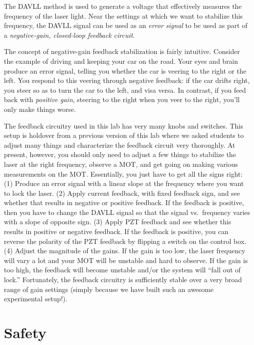 \documentclass{../lab}
\begin{document}
The DAVLL method is used to generate a voltage that effectively measures the frequency of the laser light.  Near the settings at which we want to stabilize this frequency, the DAVLL signal can be used as an \emph{error signal} to be used as part of a \emph{negative-gain, closed-loop feedback circuit}.

The concept of negative-gain feedback stabilization is fairly intuitive.  Consider the example of driving and keeping your car on the road.  Your eyes and brain produce an error signal, telling you whether the car is veering to the right or the left.  You respond to this veering through negative feedback: if the car drifts right, you steer so as to turn the car to the left, and visa versa.  In contrast, if you feed back with \emph{positive gain}, steering to the right when you veer to the right, you'll only make things worse.

The feedback circuitry used in this lab has very many knobs and switches.  This setup is holdover from a previous version of this lab where we asked students to adjust many things and characterize the feedback circuit very thoroughly.  At present, however, you should only need to adjust a few things to stabilize the laser at the right frequency, observe a MOT, and get going on making various measurements on the MOT.  Essentially, you just have to get all the signs right:  (1) Produce an error signal with a linear slope at the frequency where you want to lock the laser.  (2) Apply current feedback, with fixed feedback sign, and see whether that results in negative or positive feedback.  If the feedback is positive, then you have to change the DAVLL signal so that the signal vs.\ frequency varies with a slope of opposite sign.  (3) Apply PZT feedback and see whether this results in positive or negative feedback.  If the feedback is positive, you can reverse the polarity of the PZT feedback by flipping a switch on the control box.  (4) Adjust the magnitude of the gains.  If the gain is too low, the laser frequency will vary a lot and your MOT will be unstable and hard to observe.  If the gain is too high, the feedback will become unstable and/or the system will ``fall out of lock.''   Fortunately, the feedback circuitry is sufficiently stable over a very broad range of gain settings (simply because we have built such an awesome experimental setup!).

\section{Safety}
\end{document}
